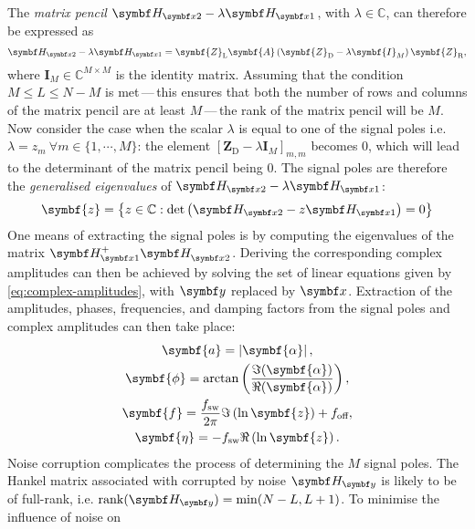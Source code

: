 The \emph{matrix pencil} $\Hxtwo - \lambda\Hxone$, with $\lambda \in
\mathbb{C}$, can therefore be expressed as
\begin{equation}
    \Hxtwo - \lambda \Hxone = \symbf{Z}_{\text{L}} \symbf{A} \left(
        \symbf{Z}_{\text{D}} - \lambda \symbf{I}_M
    \right) \symbf{Z}_{\text{R}},
\end{equation}
where $\symbf{I}_M \in \mathbb{C}^{M \times M}$ is the identity matrix.
Assuming that the condition $M \leq L \leq N - M$ is met\,---\,this ensures
that both the number of rows and columns of the matrix pencil are at least
$M$\,---\,the rank of the matrix pencil will be $M$.
Now consider the case when the scalar $\lambda$ is
equal to one of the signal poles i.e.  $\lambda = z_m\ \forall m \in
\lbrace 1, \cdots, M \rbrace$: the element $[\symbf{Z}_{\text{D}} -
\lambda \symbf{I}_M]_{m,m}$ becomes $0$, which will lead to the
determinant of the matrix pencil being $0$. The signal poles are therefore the
\emph{generalised eigenvalues} of $\Hxtwo - \lambda \Hxone$\cite[Section
7.7]{Golub2013}:
\begin{equation}
    \symbf{z} = \left\lbrace
        z \in \mathbb{C} : \det\left(\Hxtwo - z \Hxone\right) = 0
    \right\rbrace
\end{equation}
One means of extracting the signal poles is by computing the eigenvalues of the
matrix $\Hxone^+ \Hxtwo^{\vphantom{+}}$. Deriving the corresponding complex
amplitudes can then be achieved by solving the set of linear equations given by
\cref{eq:complex-amplitudes}, with $\by$ replaced by $\bx$.
Extraction of the amplitudes, phases, frequencies, and damping factors from the
signal poles and complex amplitudes can then take place:%
\begin{subequations}%
    \begin{gather}
        \symbf{a} = \left \lvert \symbf{\alpha} \right \rvert,\\
        \symbf{\phi} = \arctan \left(\frac{\Im (\symbf{\alpha})}{\Re(\symbf{\alpha})}\right),\\
        \symbf{f} = \frac{\fsw}{2 \pi} \Im\left(\ln \symbf{z} \right) + \foff,\label{eq:poles-to-f}\\
        \symbf{\eta} = -\fsw \Re\left(\ln \symbf{z}\right).
    \end{gather}
\end{subequations}
Noise corruption complicates the process of
determining the $M$ signal poles. The Hankel matrix associated with
 corrupted by noise $\Hy$ is likely to be of full-rank, i.e.
$\rank(\Hy) = \min(N - L, L + 1)$. To minimise the influence of noise on
